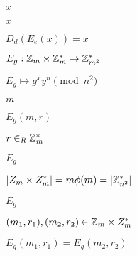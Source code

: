\documentclass[10pt]{book}
\begin{document}
\begin{mdSnippets}
\begin{mdInlineSnippet}[9dd4e461268c8034f5c8564e155c67a6]%
$x$\end{mdInlineSnippet}%
\begin{mdInlineSnippet}[9dd4e461268c8034f5c8564e155c67a6]%
$x$\end{mdInlineSnippet}%
\begin{mdInlineSnippet}[e21984fa04cb65687223f2e59f128817]%
$D_d(E_e(x))=x$\end{mdInlineSnippet}%
\begin{mdInlineSnippet}%
$E_g: \mathbb{Z}_m \times \mathbb{Z}^*_m \to \mathbb{Z}_{m^2}^*$\end{mdInlineSnippet}%
\begin{mdInlineSnippet}%
$E_g \mapsto g^xy^n \pmod n^2$\end{mdInlineSnippet}%
\begin{mdInlineSnippet}[6f8f57715090da2632453988d9a1501b]%
$m$\end{mdInlineSnippet}%
\begin{mdInlineSnippet}[a4b6d8d4254cf17796fdbb414b905c2e]%
$E_g(m,r)$\end{mdInlineSnippet}%
\begin{mdInlineSnippet}[d162a442ebc99214a7ea8a21c0212e4e]%
$r \in_R \mathbb{Z}_m^*$\end{mdInlineSnippet}%
\begin{mdInlineSnippet}%
$E_g$\end{mdInlineSnippet}%
\begin{mdInlineSnippet}%
$|Z_m \times Z_m^*| = m\phi(m) = |\mathbb{Z}_{n^2}^*|$\end{mdInlineSnippet}%
\begin{mdInlineSnippet}%
$E_g$\end{mdInlineSnippet}%
\begin{mdInlineSnippet}%
$(m_1,r_1),(m_2,r_2) \in \mathbb{Z}_m \times Z_m^*$\end{mdInlineSnippet}%
\begin{mdInlineSnippet}[934a28ae47215043ed0bf964beeb974b]%
$E_g(m_1, r_1) = E_g(m_2,r_2)$\end{mdInlineSnippet}%

\end{mdSnippets}
\end{document}
